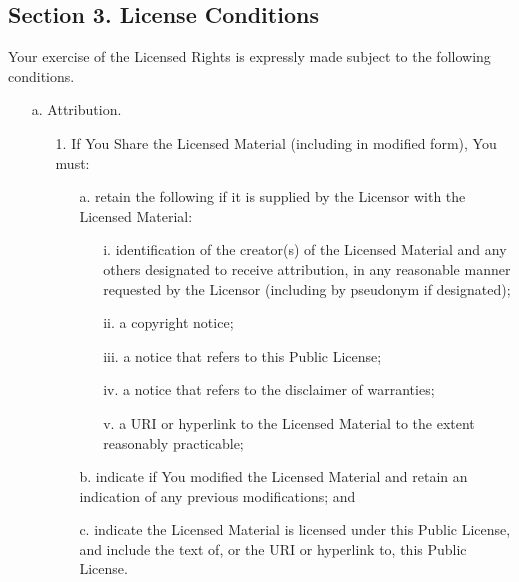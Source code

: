 \begin{scriptsize}
\subsection*{Section 3. License Conditions}

Your exercise of the Licensed Rights is expressly made subject to the
following conditions.

\begin{itemize}
  \item[a.] Attribution.

	\begin{itemize}
       \item[1.] If You Share the Licensed Material (including in modified
          form), You must:

		\begin{itemize}
            \item[a.] retain the following if it is supplied by the Licensor
               with the Licensed Material:

				\begin{itemize}
                 \item[i.] identification of the creator(s) of the Licensed
                    Material and any others designated to receive
                    attribution, in any reasonable manner requested by
                    the Licensor (including by pseudonym if
                    designated);

                \item[ii.] a copyright notice;

               \item[iii.] a notice that refers to this Public License;

                \item[iv.] a notice that refers to the disclaimer of
                    warranties;

                 \item[v.] a URI or hyperlink to the Licensed Material to the
                    extent reasonably practicable;
				\end{itemize}

            \item[b.] indicate if You modified the Licensed Material and
               retain an indication of any previous modifications; and

            \item[c.] indicate the Licensed Material is licensed under this
               Public License, and include the text of, or the URI or
               hyperlink to, this Public License.
		\end{itemize}


\end{itemize}
\end{itemize}
\end{scriptsize}
